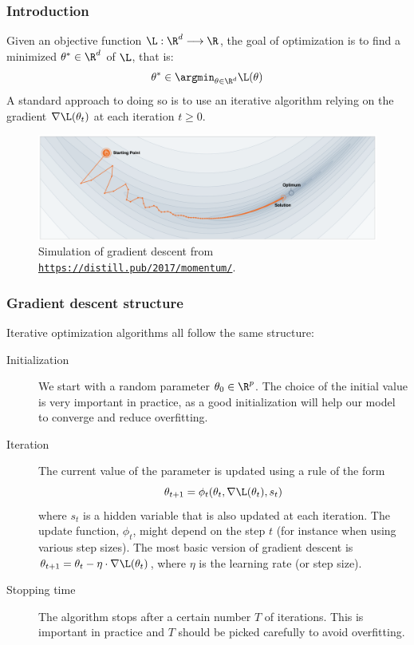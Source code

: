 \subsubsection{Introduction}
Given an objective function $\L:\R^d\longrightarrow\R$, the goal of optimization is to find a minimized $\theta^*\in\R^d$ of $\L$, that is:
\begin{equation*}
    \theta^*\in\argmin_{\theta\in\R^d}\L(\theta)
\end{equation*}
A standard approach to doing so is to use an iterative algorithm relying on the gradient $\nabla\L(\theta_t)$ at each iteration $t\geq0$.
\begin{figure}[H]
    \centering
    \includegraphics[width=.9\textwidth]{images/distill-momentum.png}
    \caption{Simulation of gradient descent from \href{https://distill.pub/2017/momentum/}{\nolinkurl{https://distill.pub/2017/momentum/}}.}  
\end{figure}

\subsubsection{Gradient descent structure}
Iterative optimization algorithms all follow the same structure:
\begin{description}
    \item[Initialization] We start with a random parameter $\theta_0\in\R^p$. The choice of the initial value is very important in practice, as a good initialization will help our model to converge and reduce overfitting.
    \item[Iteration] The current value of the parameter is updated using a rule of the form
    \begin{equation*}
        \theta_{t+1}=\phi_t(\theta_t,\nabla\L(\theta_t),s_t)
    \end{equation*}
    where $s_t$ is a hidden variable that is also updated at each iteration. The update function, $\phi_t$, might depend on the step $t$ (for instance when using various step sizes). The most basic version of gradient descent is $\theta_{t+1}=\theta_t-\eta\cdot\nabla\L(\theta_t)$, where $\eta$ is the learning rate (or step size).
    \item[Stopping time] The algorithm stops after a certain number $T$ of iterations. This is important in practice and $T$ should be picked carefully to avoid overfitting.
\end{description}

